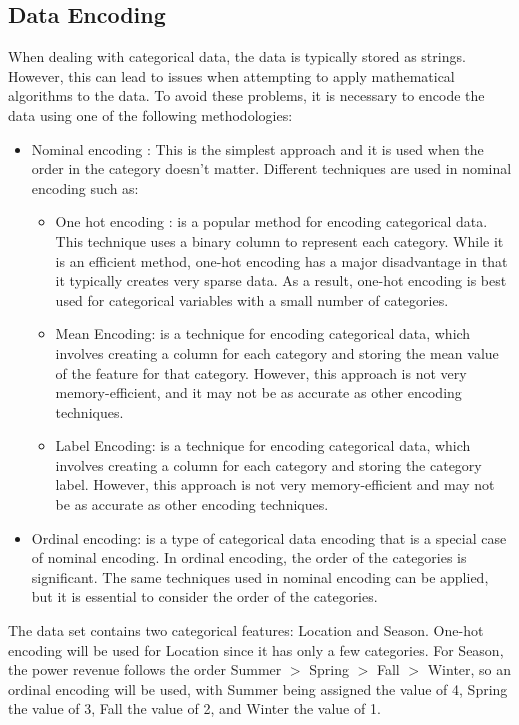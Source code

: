 \documentclass{report}
\begin{document}
\subsection{Data Encoding}
When dealing with categorical data, the data is typically stored as strings. However, this can lead to issues when attempting to apply mathematical algorithms to the data. To avoid these problems, it is necessary to encode the data using one of the following methodologies:
\begin{itemize}
    \item Nominal encoding : This is the simplest approach and it is used when the order in the category doesn’t matter. Different techniques are used in nominal encoding such as:    \begin{itemize}
        \item One hot encoding : is a popular method for encoding categorical data. This technique uses a binary column to represent each category. While it is an efficient method, one-hot encoding has a major disadvantage in that it typically creates very sparse data. As a result, one-hot encoding is best used for categorical variables with a small number of categories.
        \item Mean Encoding: is a technique for encoding categorical data, which involves creating a column for each category and storing the mean value of the feature for that category. However, this approach is not very memory-efficient, and it may not be as accurate as other encoding techniques.
        \item Label Encoding:  is a technique for encoding categorical data, which involves creating a column for each category and storing the category label. However, this approach is not very memory-efficient and may not be as accurate as other encoding techniques.
    \end{itemize}
    \item Ordinal encoding: is a type of categorical data encoding that is a special case of nominal encoding. In ordinal encoding, the order of the categories is significant. The same techniques used in nominal encoding can be applied, but it is essential to consider the order of the categories.
\end{itemize}
The data set contains two categorical features: Location and Season. One-hot encoding will be used for Location since it has only a few categories. For Season, the power revenue follows the order Summer $>$ Spring $>$ Fall $>$ Winter, so an ordinal encoding will be used, with Summer being assigned the value of 4, Spring the value of 3, Fall the value of 2, and Winter the value of 1.
\end{document}
